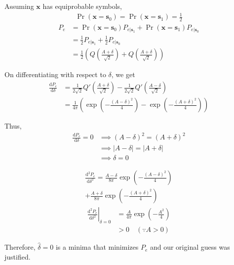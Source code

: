 \documentclass[journal,12pt,twocolumn]{IEEEtran}
\providecommand{\pr}[1]{\ensuremath{\Pr\left(#1\right)}}
\providecommand{\brak}[1]{\ensuremath{\left(#1\right)}}
\providecommand{\der}[1]{\mathrm{d} #1}
\let\vec\mathbf
\numberwithin{equation}{section}
\renewcommand\thesection{\arabic{section}}
\begin{document}
\begin{enumerate}[label=\thesection.\arabic*,ref=\thesection.\theenumi]
	Assuming $\vec{x}$ has equiprobable symbols,
	\begin{align}
		\pr{\vec{x} = \vec{s}_0} = \pr{\vec{x} = \vec{s}_1} = \frac{1}{2}
	\end{align}
	\begin{align}
		P_e &= \pr{\vec{x} = \vec{s}_0} P_{e|\vec{s}_1} + \pr{\vec{x} = \vec{s}_1} P_{e|\vec{s}_0} \\
		&= \frac{1}{2} P_{e|\vec{s}_1} + \frac{1}{2} P_{e|\vec{s}_0} \\
		&= \frac{1}{2} \brak{Q\brak{\frac{A+\delta}{\sqrt{2}}} + Q\brak{\frac{A+\delta}{\sqrt{2}}}}
	\end{align}
	
	On differentiating with respect to $\delta$, we get
	\begin{align}
		\frac{\der{P_e}}{\der{\delta}} &= \frac{1}{2\sqrt{2}} Q'\brak{\frac{A+\delta}{\sqrt{2}}} - \frac{1}{2\sqrt{2}} Q'\brak{\frac{A-\delta}{\sqrt{2}}} \\
		&= \frac{1}{4\pi} \brak{\exp\brak{-\frac{(A-\delta)^2}{4}} - \exp\brak{-\frac{(A+\delta)^2}{4}}}
	\end{align}
	
	Thus,
	\begin{align}
		\frac{\der{P_e}}{\der{\delta}} = 0 &\implies (A-\delta)^2 = (A+\delta)^2 \\
		&\implies |A-\delta| = |A+\delta| \\
		&\implies \delta = 0
	\end{align}
	
	\begin{multline}
		\frac{\mathrm{d}^2 P_e}{\der{\delta^2}} = \frac{A-\delta}{8\pi} \exp\brak{-\frac{(A-\delta)^2}{4}} \\
		+ \frac{A+\delta}{8\pi} \exp\brak{-\frac{(A+\delta)^2}{4}}
	\end{multline}
	\begin{align}
		\left. \frac{\mathrm{d}^2 P_e}{\der{\delta^2}} \right|_{\delta=0} &= \frac{A}{4\pi} \exp\brak{-\frac{A^2}{4}} \\
		&> 0 \quad (\because A > 0)
	\end{align}
	
	Therefore, $\hat{\delta} = 0$ is a minima that minimizes $P_e$ and our original guess was justified.
	\end{enumerate}
\end{document}
